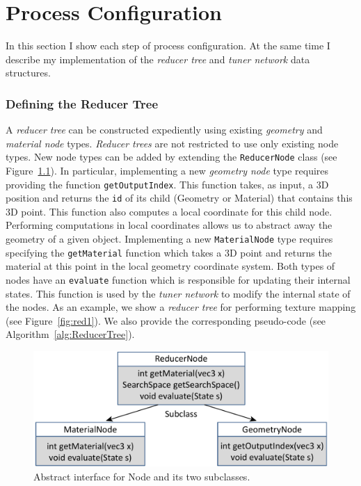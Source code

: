 \chapter{Process Configuration}
\label{sec:config}
In this section I show each step of process configuration. At the same time I describe my implementation of the 
\emph{reducer tree} and \emph{tuner network} data structures.

\subsection{Defining the Reducer Tree}
A \emph{reducer tree} can be constructed expediently using existing \emph{geometry} and \emph{material node} types.
\emph{Reducer trees} are not restricted to use only existing node types.
New node types can be added by extending the \verb|ReducerNode| class (see Figure~\ref{fig:node}).
In particular, implementing a new \emph{geometry node} type requires providing the function \verb|getOutputIndex|.
This function takes, as input, a 3D position and returns the \verb|id| of its child (Geometry or Material)
that contains this 3D point.
This function also computes a local coordinate for this child node.
Performing computations in local coordinates allows us to abstract away the geometry of a given object.
Implementing a new \verb|MaterialNode| type requires specifying the \verb|getMaterial| function
which takes a 3D point and returns the material at this point in the local geometry coordinate system.
Both types of nodes have an \verb|evaluate| function which is responsible for updating their internal states.
This function is used by the \emph{tuner network} to modify the internal state of the nodes.
As an example, we show a \emph{reducer tree} for performing texture mapping (see Figure~\ref{fig:red1}).
We also provide the corresponding pseudo-code (see Algorithm~\ref{alg:ReducerTree}).


\begin{figure}[h]
\centering
\includegraphics[width=\linewidth]{figure/node.pdf}
\caption{Abstract interface for Node and its two subclasses.}
\label{fig:node}
\end{figure}

